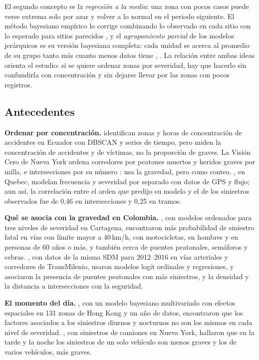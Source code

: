 \documentclass[10pt,twocolumn]{article}
\begin{document}
El segundo concepto es la \emph{regresión a la media}: una zona con pocos casos puede verse extrema solo por azar y volver a lo normal en el periodo siguiente. El método bayesiano empírico lo corrige combinando lo observado en cada sitio con lo esperado para sitios parecidos \citep{hauer2002screening}, y el \emph{agrupamiento parcial} de los modelos jerárquicos es su versión bayesiana completa: cada unidad se acerca al promedio de su grupo tanto más cuanto menos datos tiene \citep[cap.~15]{johnson2022bayes}, \citep[cap.~5]{gelman2013bda}. La relación entre ambas ideas orienta el estudio: si se quiere ordenar zonas por severidad, hay que hacerlo sin confundirla con concentración y sin dejarse llevar por las zonas con pocos registros.

\subsection{Antecedentes}
\textbf{Ordenar por concentración.} \citet{chavez2026spatiotemporal} identifican zonas y horas de concentración de accidentes en Ecuador con DBSCAN y series de tiempo, pero miden la concentración de accidentes y de víctimas, no la proporción de graves. La Visión Cero de Nueva York ordena corredores por peatones muertos y heridos graves por milla, e intersecciones por su número \citep{nycdot2023}: usa la gravedad, pero como conteo. \citet{stipancic2019network}, en Quebec, modelan frecuencia y severidad por separado con datos de GPS y flujo; aun así, la correlación entre el orden que predijo su modelo y el de los siniestros observados fue de 0,46 en intersecciones y 0,25 en tramos.

\textbf{Qué se asocia con la gravedad en Colombia.} \citet{cantillo2020exploratory}, con modelos ordenados para tres niveles de severidad en Cartagena, encontraron más probabilidad de siniestro fatal en vías con límite mayor a 40\,km/h, con motocicletas, en hombres y en personas de 60 años o más, y también cerca de puentes peatonales, semáforos y cebras. \citet{vergel2020examining}, con datos de la misma SDM para 2012--2016 en vías arteriales y corredores de TransMilenio, usaron modelos logit ordinales y regresiones, y asociaron la presencia de puentes peatonales con más siniestros, y la densidad y la distancia a intersecciones con la seguridad.

\textbf{El momento del día.} \citet{zeng2023bayesian}, con un modelo bayesiano multivariado con efectos espaciales en 131 zonas de Hong Kong y un año de datos, encontraron que los factores asociados a los siniestros diurnos y nocturnos no son los mismos en cada nivel de severidad. \citet{zou2017truck}, con siniestros de camiones en Nueva York, hallaron que en la tarde y la noche los siniestros de un solo vehículo son menos graves y los de varios vehículos, más graves.
\end{document}
